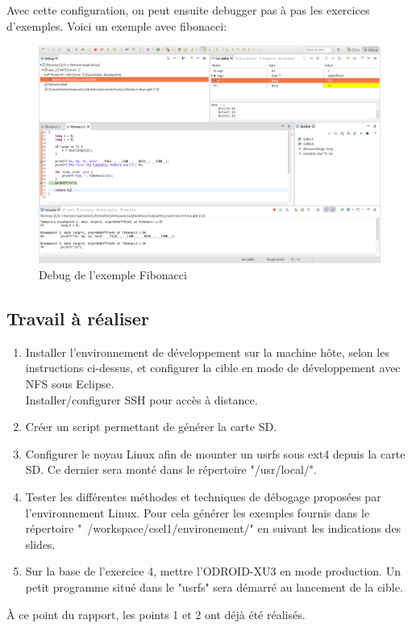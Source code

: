 Avec cette configuration, on peut ensuite debugger pas à pas les exercices d’exemples. Voici un exemple avec fibonacci:
\begin{figure}[H]
	\begin{center}
		\includegraphics[width=16.5cm]{img/eclipseConfig5.png}
		\caption{Debug de l'exemple Fibonacci}
		\label{eclipseConfig5}
	\end{center}
\end{figure}
\subsection{Travail à réaliser}
\begin{enumerate}
	\item Installer l'environnement de développement sur la machine hôte, selon les instructions ci-dessus, et configurer la cible en mode de développement avec NFS sous Eclipse.\\Installer/configurer SSH pour accès à distance.
	\item Créer un script permettant de générer la carte SD.
	\item Configurer le noyau Linux afin de mounter un usrfs sous ext4 depuis la carte SD. Ce dernier sera monté dans le répertoire "/usr/local/".
	\item Tester les différentes méthodes et techniques de débogage proposées par l'environnement Linux. Pour cela générer les exemples fournis dans le répertoire "~/workspace/csel1/environement/" en suivant les indications des slides.
	\item Sur la base de l'exercice 4, mettre l'ODROID-XU3 en mode production. Un petit programme situé dans le "usrfs" sera démarré au lancement de la cible.
\end{enumerate}
À ce point du rapport, les points 1 et 2 ont déjà été réalisés.
